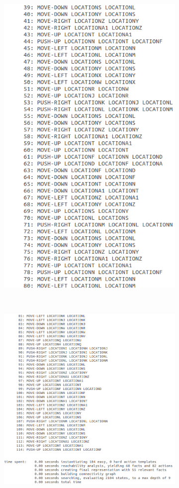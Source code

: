 \documentclass[10pt, letter]{article}
\begin{document}
\begin{figure} [h!]
\begin{subfigure}{.5\textwidth}
  \includegraphics[scale = 0.3]{images/FF_Solution_p2_3_2}
\end{subfigure}\\
\begin{subfigure}{\textwidth}
  \centering
  \includegraphics[scale = 0.3]{images/FF_Solution_p2_3_3}

\end{subfigure}
\end{figure}
\end{document}
